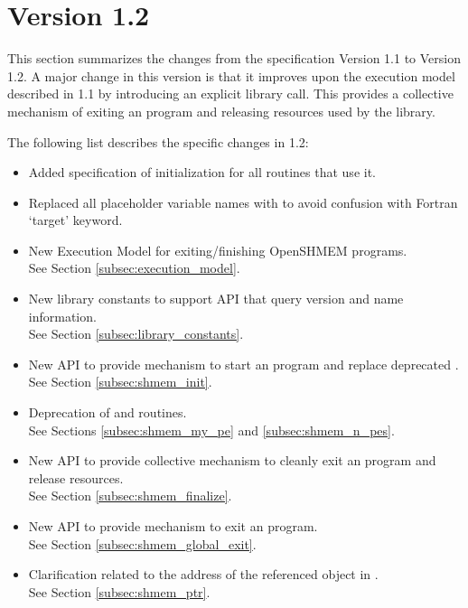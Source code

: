 \section{Version 1.2}
This section summarizes the changes from the \openshmem specification Version
1.1 to Version 1.2.  A major change in this version is that it improves upon the
execution model described in 1.1 by introducing an explicit
 library call. This provides a collective mechanism of
exiting an \openshmem program and releasing resources used by the library.  


The following list describes the specific changes in 1.2:

\begin{itemize}
%
\item Added specification of  initialization for all routines that use it.
%
\item Replaced all placeholder variable names  with  to
      avoid confusion with Fortran `target' keyword.
%
\item New Execution Model for exiting/finishing OpenSHMEM programs.
\\See Section  \ref{subsec:execution_model}.
%
\item New library constants to support API that query version and name information.
\\See Section \ref{subsec:library_constants}.
%
\item New API  to provide mechanism to start an \openshmem
      program and replace deprecated .
\\See Section \ref{subsec:shmem_init}.
%
\item Deprecation of  and  routines.
\\See Sections \ref{subsec:shmem_my_pe} and \ref{subsec:shmem_n_pes}.
%
\item New API  to provide collective mechanism to cleanly
      exit an \openshmem program and release resources.
\\See Section \ref{subsec:shmem_finalize}.
%
\item New API  to provide mechanism to exit an
    \openshmem program.
\\See Section \ref{subsec:shmem_global_exit}.
%
\item Clarification related to the address of the referenced object in
    .
\\See Section \ref{subsec:shmem_ptr}.

\end{itemize}
